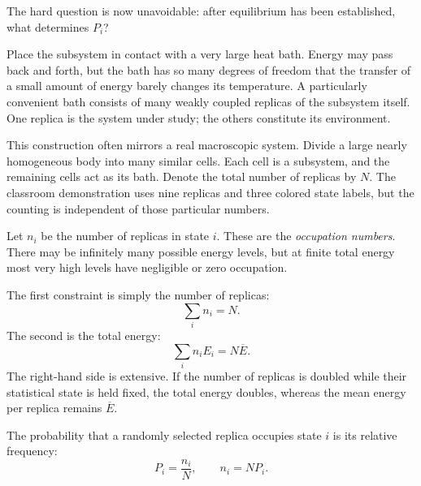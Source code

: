 The hard question is now unavoidable: after equilibrium has been established,
what determines \(P_i\)?

Place the subsystem in contact with a very large heat bath. Energy may pass
back and forth, but the bath has so many degrees of freedom that the transfer
of a small amount of energy barely changes its temperature. A particularly
convenient bath consists of many weakly coupled replicas of the subsystem
itself. One replica is the system under study; the others constitute its
environment.

This construction often mirrors a real macroscopic system. Divide a large
nearly homogeneous body into many similar cells. Each cell is a subsystem,
and the remaining cells act as its bath. Denote the total number of replicas
by \(N\). The classroom demonstration uses nine replicas and three colored
state labels, but the counting is independent of those particular numbers.

Let \(n_i\) be the number of replicas in state \(i\). These are the
\emph{occupation numbers}. There may be infinitely many possible energy
levels, but at finite total energy most very high levels have negligible or
zero occupation.

The first constraint is simply the number of replicas:
\begin{equation}
 \sum_i n_i=N.
 \label{eq:sm3-number-constraint}
\end{equation}
The second is the total energy:
\begin{equation}
 \sum_i n_iE_i=N\overline E.
 \label{eq:sm3-total-energy-constraint}
\end{equation}
The right-hand side is extensive. If the number of replicas is doubled while
their statistical state is held fixed, the total energy doubles, whereas the
mean energy per replica remains \(\overline E\).

\begin{classroomqa}
\end{classroomqa}

The probability that a randomly selected replica occupies state \(i\) is its
relative frequency:
\begin{equation}
 P_i=\frac{n_i}{N},
 \qquad
 n_i=NP_i.
 \label{eq:sm3-frequency-probability}
\end{equation}

